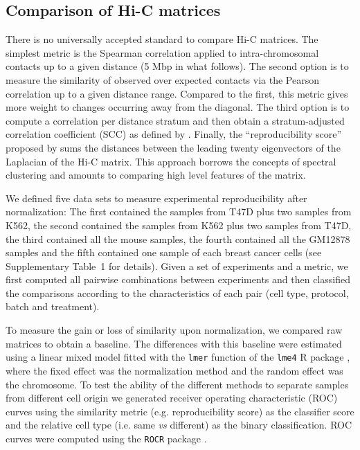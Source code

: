 \documentclass[a4,center,fleqn]{NAR}
\begin{document}
\subsection{Comparison of Hi-C matrices}

There is no universally accepted standard to compare Hi-C matrices. The
simplest metric is the Spearman correlation applied to intra-chromosomal
contacts up to a given distance (5 Mbp in what follows). The second option
is to measure the similarity of observed over expected contacts via the
Pearson correlation up to a given distance range. Compared to the first,
this metric gives more weight to changes occurring away from the diagonal.
The third option is to compute a correlation per distance stratum and then
obtain a stratum-adjusted correlation coefficient (SCC) as defined by
\cite{yang2017hicrep}. Finally, the ``reproducibility score'' proposed by
\cite{yan2017hicspector} sums the distances between the leading twenty
eigenvectors of the Laplacian of the Hi-C matrix. This approach borrows
the concepts of spectral clustering \citep{von2007tutorial} and amounts to
comparing high level features of the matrix.

We defined five data sets to measure experimental reproducibility after
normalization: The first contained the samples from T47D plus two samples
from K562, the second contained the samples from K562 plus two samples
from T47D, the third contained all the mouse samples, the fourth contained
all the GM12878 samples and the fifth contained one sample of each breast
cancer cells (see Supplementary Table~1 for details). Given a set of
experiments and a metric, we first computed all pairwise combinations
between experiments and then classified the comparisons according to the
characteristics of each pair (cell type, protocol, batch and treatment).

To measure the gain or loss of similarity upon normalization, we compared
raw matrices to obtain a baseline. The differences with this baseline were
estimated using a linear mixed model fitted with the \texttt{lmer}
function of the \texttt{lme4} R package \citep{bates2015lme4}, where the
fixed effect was the normalization method and the random effect was the
chromosome. To test the ability of the different methods to separate
samples from different cell origin we generated receiver operating
characteristic (ROC) curves using the similarity metric (e.g.
reproducibility score) as the classifier score and the relative cell type
(i.e. same \textit{vs} different) as the binary classification. ROC curves
were computed using the \texttt{ROCR} package \citep{sing2005rocr}.
\end{document}
